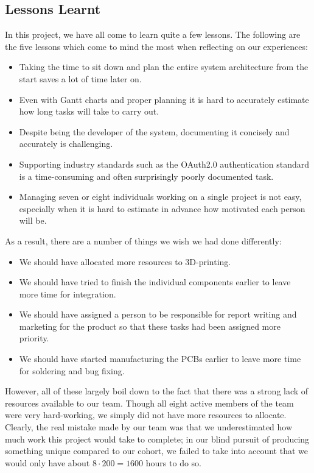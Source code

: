 \documentclass[onecolumn]{IEEEtran}
\begin{document}
{    \subsection{Lessons Learnt}
        {In this project, we have all come to learn quite a few lessons. The following are the five lessons which come to mind the most when reflecting on our experiences:}
            \begin{itemize}
                \item {Taking the time to sit down and plan the entire system architecture from the start saves a lot of time later on.}
                \item {Even with Gantt charts and proper planning it is hard to accurately estimate how long tasks will take to carry out.}
                \item {Despite being the developer of the system, documenting it concisely and accurately is challenging.}
                \item {Supporting industry standards such as the OAuth2.0 authentication standard is a time-consuming and often surprisingly poorly documented task.}
                \item {Managing seven or eight individuals working on a single project is not easy, especially when it is hard to estimate in advance how motivated each person will be.}
            \end{itemize}
        {As a result, there are a number of things we wish we had done differently:}
            \begin{itemize}
                \item {We should have allocated more resources to 3D-printing.}
                \item {We should have tried to finish the individual components earlier to leave more time for integration.}
                \item {We should have assigned a person to be responsible for report writing and marketing for the product so that these tasks had been assigned more priority.}
                \item {We should have started manufacturing the PCBs earlier to leave more time for soldering and bug fixing.}
            \end{itemize}
        {However, all of these largely boil down to the fact that there was a strong lack of resources available to our team. Though all eight active members of the team were very hard-working, we simply did not have more resources to allocate. Clearly, the real mistake made by our team was that we underestimated how much work this project would take to complete; in our blind pursuit of producing something unique compared to our cohort, we failed to take into account that we would only have about $8 \cdot 200 = 1600$ hours to do so.}
    
}
\end{document}
